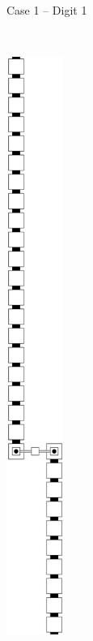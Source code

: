 \begin{enumerate}[label={--}]
\begin{figure}[H]
\begin{subfigure}[t]{0.2\textwidth}
                        \caption{\label{fig:warping/pre_warp_case1_digit1_msr} Case 1 -- Digit 1}
                    \end{subfigure}%
                    ~
                    \begin{subfigure}[t]{0.2\textwidth}
                        \centering
                        \includegraphics[width=0.2\textwidth]{warping/pre_warp_case2_digit1_msr}

\end{subfigure}
\end{figure}
\end{enumerate}
